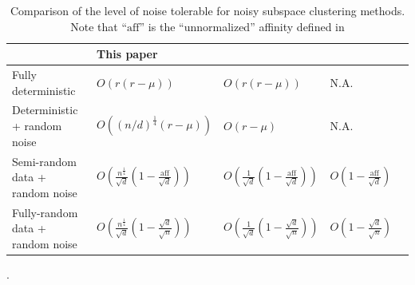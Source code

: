 \documentclass{ctexart}
\begin{document}


\begin{table}
\centering
\small{
\begin{tabular}{|p{2.2in}|p{1.05in}|p{1in}|p{1in}|p{1.2in}|}
  \hline
   & This paper & \cite{wang2013noisy} & \cite{soltanolkotabi2013robust} \\\hline %
  Fully deterministic & $O(r(r-\mu))$ & $O(r(r-\mu))$ & N.A.  \\\hline
  Deterministic + random noise & $O((n/d)^{\frac{1}{4}}(r-\mu))$ & $O(r-\mu)$ & N.A.   \\\hline
  Semi-random data + random noise & $O\left(\frac{n^{\frac{1}{4}}}{\sqrt{d}}(1-\frac{\text{aff}}{\sqrt{d}})\right)$ & $O\left(\frac{1}{\sqrt{d}}(1-\frac{\text{aff}}{\sqrt{d}})\right)$ & $O\left(1-\frac{\text{aff}}{\sqrt{d}}\right)$  \\\hline
    Fully-random data + random noise & $O\left(\frac{n^{\frac{1}{4}}}{\sqrt{d}}(1-\frac{\sqrt{d}}{\sqrt{n}})\right)$ & $O\left(\frac{1}{\sqrt{d}}(1-\frac{\sqrt{d}}{\sqrt{n}})\right)$ & $O\left(1-\frac{\sqrt{d}}{\sqrt{n}}\right)$  \\
  \hline
\end{tabular}
}
\caption{Comparison of the level of noise tolerable for noisy subspace clustering methods. Note that ``$\mathrm{aff}$'' is the ``unnormalized'' affinity defined in \cite{soltanolkotabi2011geometric}}.\label{tab:comparison}
\end{table}
\end{document}

